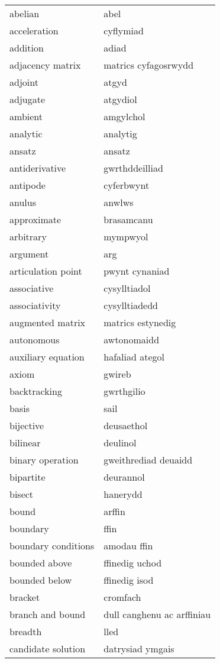 \begin{supertabular}{p{0.22\textwidth}p{0.22\textwidth}}
\midrule
abelian & abel \\
acceleration & cyflymiad \\
addition & adiad \\
adjacency matrix & matrics cyfagosrwydd \\
adjoint & atgyd \\
adjugate & atgydiol \\
ambient & amgylchol \\
analytic & analytig \\
ansatz & ansatz \\
antiderivative & gwrthddeilliad \\
antipode & cyferbwynt \\
anulus & anwlws \\
approximate & brasamcanu \\
arbitrary & mympwyol \\
argument & arg \\
articulation point & pwynt cynaniad \\
associative & cysylltiadol \\
associativity & cysylltiadedd \\
augmented matrix & matrics estynedig \\
autonomous & awtonomaidd \\
auxiliary equation & hafaliad ategol \\
axiom & gwireb \\
backtracking & gwrthgilio \\
basis & sail \\
bijective & deusaethol \\
bilinear & deulinol \\
binary operation & gweithrediad deuaidd \\
bipartite & deurannol \\
bisect & hanerydd \\
bound & arffin \\
boundary & ffin \\
boundary conditions & amodau ffin \\
bounded above & ffinedig uchod \\
bounded below & ffinedig isod \\
bracket & cromfach \\
branch and bound & dull canghenu ac arffiniau \\
breadth & lled \\
candidate solution & datrysiad ymgais \\

\end{supertabular}

